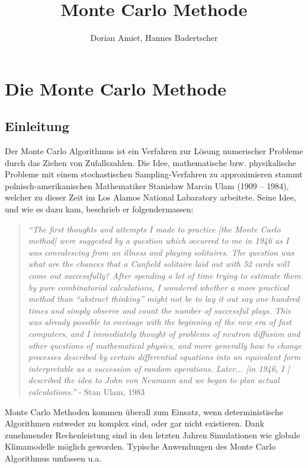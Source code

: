 \documentclass{book}
\begin{document}
\title{Monte Carlo Methode}
\author{Dorian Amiet, Hannes Badertscher}
\date{}
\maketitle



\chapter{Die Monte Carlo Methode}
\begin{refsection}

\section{Einleitung}
Der Monte Carlo Algorithmus ist ein Verfahren zur Lösung numerischer Probleme durch das Ziehen von Zufallszahlen. Die Idee, mathematische bzw. physikalische Probleme mit einem stochastischen Sampling-Verfahren zu approximieren stammt polnisch-amerikanischen Mathematiker Stanisław Marcin Ulam (1909 -- 1984), welcher zu dieser Zeit im Los Alamos National Labaratory arbeitete. Seine Idee, und wie es dazu kam, beschrieb er folgendermassen: \\

\begin{quote}
\textit{“The first thoughts and attempts I made to practice [the Monte Carlo method] were suggested by a question which occurred to me in 1946 as I was convalescing from an illness and playing solitaires. The question was what are the chances that a Canfield solitaire laid out with 52 cards will come out successfully? After spending a lot of time trying to estimate them by pure combinatorial calculations, I wondered whether a more practical method than “abstract thinking” might not be to lay it out say one hundred times and simply observe and count the number of successful plays. This was already possible to envisage with the beginning of the new era of fast computers, and I immediately thought of problems of neutron diffusion and other questions of mathematical physics, and more generally how to change processes described by certain differential equations into an equivalent form interpretable as a succession of random operations. Later... [in 1946, I ] described the idea to John von Neumann and we began to plan actual calculations.”} - Stan Ulam, 1983
\end{quote}

Monte Carlo Methoden kommen überall zum Einsatz, wenn deterministische Algorithmen entweder zu komplex sind, oder gar nicht existieren. Dank zunehmender Rechenleistung sind in den letzten Jahren Simulationen wie globale Klimamodelle möglich geworden. Typische Anwendungen des Monte Carlo Algorithmus umfassen u.a.


\end{refsection}
\end{document}

